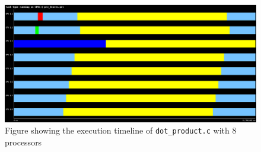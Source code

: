 \documentclass[a4paper,11pt]{article}
\begin{document}
\begin{enumerate}
  \begin{figure}[h!]
    \begin{center}
    \includegraphics[width=1\textwidth]{dot_product/execution_graph_8_cores.png}
    \caption{Figure showing the execution timeline of \texttt{dot\_product.c} with 8 processors}
    \end{center}
  \end{figure}
\end{enumerate}

\clearpage
\end{document}
